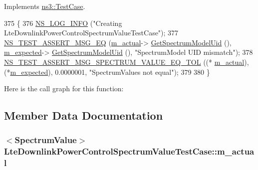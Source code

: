 Implements \hyperlink{classns3_1_1TestCase_a8ff74680cf017ed42011e4be51917a24}{ns3\+::\+Test\+Case}.


\begin{DoxyCode}
375 \{
376   \hyperlink{group__logging_gafbd73ee2cf9f26b319f49086d8e860fb}{NS\_LOG\_INFO} (\textcolor{stringliteral}{"Creating LteDownlinkPowerControlSpectrumValueTestCase"});
377   \hyperlink{group__testing_ga2a9d78cffb3db8e867c35fff0b698cf5}{NS\_TEST\_ASSERT\_MSG\_EQ} (\hyperlink{classLteDownlinkPowerControlSpectrumValueTestCase_a24aef4fd84236fe9d2c66da397971acc}{m\_actual}->
      \hyperlink{classns3_1_1SpectrumValue_a13ebad7a54b23f2b05c01e442c1e66fd}{GetSpectrumModelUid} (), \hyperlink{classLteDownlinkPowerControlSpectrumValueTestCase_a6615e7aab6c6d83be1dd11c5d4b797ef}{m\_expected}->
      \hyperlink{classns3_1_1SpectrumValue_a13ebad7a54b23f2b05c01e442c1e66fd}{GetSpectrumModelUid} (), \textcolor{stringliteral}{"SpectrumModel UID mismatch"});
378   \hyperlink{spectrum-test_8h_ac37d86c7027e04c671885b0f087ab7e0}{NS\_TEST\_ASSERT\_MSG\_SPECTRUM\_VALUE\_EQ\_TOL} ((*
      \hyperlink{classLteDownlinkPowerControlSpectrumValueTestCase_a24aef4fd84236fe9d2c66da397971acc}{m\_actual}), (*\hyperlink{classLteDownlinkPowerControlSpectrumValueTestCase_a6615e7aab6c6d83be1dd11c5d4b797ef}{m\_expected}), 0.0000001, \textcolor{stringliteral}{"SpectrumValues not equal"});
379 
380 \}
\end{DoxyCode}


Here is the call graph for this function\+:




\subsection{Member Data Documentation}
\subsubsection[{\texorpdfstring{m\+\_\+actual}{m_actual}}]{$<${\bf Spectrum\+Value}$>$ Lte\+Downlink\+Power\+Control\+Spectrum\+Value\+Test\+Case\+::m\+\_\+actual\hspace{0.3cm}{\ttfamily [private]}}\hypertarget{classLteDownlinkPowerControlSpectrumValueTestCase_a24aef4fd84236fe9d2c66da397971acc}{}\label{classLteDownlinkPowerControlSpectrumValueTestCase_a24aef4fd84236fe9d2c66da397971acc}
